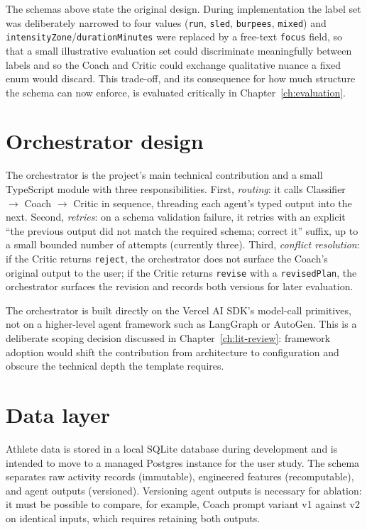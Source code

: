 The schemas above state the original design. During implementation the label set was deliberately narrowed to four values (\texttt{run}, \texttt{sled}, \texttt{burpees}, \texttt{mixed}) and \texttt{intensityZone}/\texttt{durationMinutes} were replaced by a free-text \texttt{focus} field, so that a small illustrative evaluation set could discriminate meaningfully between labels and so the Coach and Critic could exchange qualitative nuance a fixed enum would discard. This trade-off, and its consequence for how much structure the schema can now enforce, is evaluated critically in Chapter~\ref{ch:evaluation}.

\section{Orchestrator design}

The orchestrator is the project's main technical contribution and a small TypeScript module with three responsibilities. First, \emph{routing}: it calls Classifier $\to$ Coach $\to$ Critic in sequence, threading each agent's typed output into the next. Second, \emph{retries}: on a schema validation failure, it retries with an explicit ``the previous output did not match the required schema; correct it'' suffix, up to a small bounded number of attempts (currently three). Third, \emph{conflict resolution}: if the Critic returns \texttt{reject}, the orchestrator does not surface the Coach's original output to the user; if the Critic returns \texttt{revise} with a \texttt{revisedPlan}, the orchestrator surfaces the revision and records both versions for later evaluation.

The orchestrator is built directly on the Vercel AI SDK's model-call primitives, not on a higher-level agent framework such as LangGraph or AutoGen. This is a deliberate scoping decision discussed in Chapter~\ref{ch:lit-review}: framework adoption would shift the contribution from architecture to configuration and obscure the technical depth the template requires.

\section{Data layer}

Athlete data is stored in a local SQLite database during development and is intended to move to a managed Postgres instance for the user study. The schema separates raw activity records (immutable), engineered features (recomputable), and agent outputs (versioned). Versioning agent outputs is necessary for ablation: it must be possible to compare, for example, Coach prompt variant v1 against v2 on identical inputs, which requires retaining both outputs.

